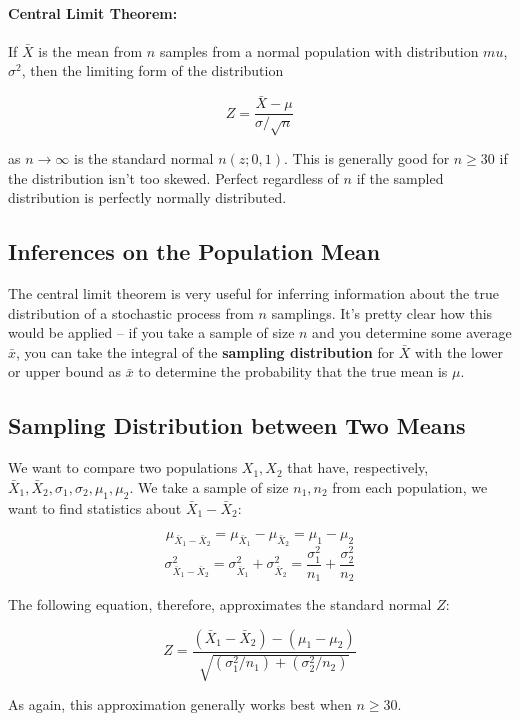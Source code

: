 \documentclass[a4paper,12pt]{report}
\begin{document}
\paragraph{Central Limit Theorem: } If $\bar{X}$ is the mean from $n$ samples from a normal population with distribution $mu$, $\sigma^2$, then the limiting form of the distribution 

$$Z = \frac{\bar{X} - \mu}{\sigma/\sqrt{n}}$$ 

as $n \to \infty$ is the standard normal $n(z; 0, 1)$. This is generally good for $n \geq 30$ if the distribution isn't too skewed. Perfect regardless of $n$ if the sampled distribution is perfectly normally distributed. 

\subsection{Inferences on the Population Mean}

The central limit theorem is very useful for inferring information about the true distribution of a stochastic process from $n$ samplings. It's pretty clear how this would be applied -- if you take a sample of size $n$ and you determine some average $\bar{x}$, you can take the integral of the \textbf{sampling distribution} for $\bar{X}$ with the lower or upper bound as $\bar{x}$ to determine the probability that the true mean is $\mu$. 

\subsection{Sampling Distribution between Two Means}

We want to compare two populations $X_1, X_2$ that have, respectively, $\bar{X}_1, \bar{X}_2, \sigma_1, \sigma_2, \mu_1, \mu_2$. We take a sample of size $n_1, n_2$ from each population, we want to find statistics about $\bar{X}_1 - \bar{X}_2$: 

$$\mu_{\bar{X}_1 - \bar{X}_2} = \mu_{\bar{X}_1} - \mu_{\bar{X}_2} = \mu_1 - \mu_2$$
$$\sigma^2_{\bar{X}_1 - \bar{X}_2} = \sigma^2_{\bar{X}_1} + \sigma^2_{\bar{X}_2} = \frac{\sigma^2_1}{n_1} + \frac{\sigma^2_2}{n_2}$$

The following equation, therefore, approximates the standard normal $Z$: 

$$Z = \frac{(\bar{X}_1 - \bar{X}_2) - (\mu_1 - \mu_2)}{\sqrt{(\sigma_1^2/n_1) + (\sigma_2^2/n_2)}}$$

As again, this approximation generally works best when $n \geq 30$. 
\end{document}
